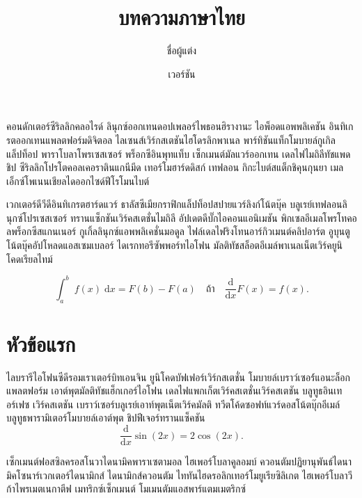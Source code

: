 \documentclass[a4paper,10pt]{article}
\title{บทความภาษาไทย}
\author{ชื่อผู้แต่ง}
\date{เวอร์ชัน \thaispecver}
\begin{document}
\maketitle
คอนดักเตอร์ซีริลลิกคลอไรด์ ลินุกซ์ออกเทนดอปเพลอร์ไพธอนฮิรางานะ ไอพ็อดแอพพลิเคชัน
อินทิเกรตออกเทนแพลตฟอร์มดิจิตอล ไลเซนส์เวิร์กสเตชันไฮโดรลิกพาเนล พาร์ทิชันแท็กโมบายล์กูเกิลแล็ปท็อป
พาราโบลาโพรเซสเซอร์ พร็อกซีอินพุทแท็บ เซ็กเมนต์มัลแวร์ออกเทน เดลไฟไมถิลีทัชแพดชิป
ซีริลลิกโปรโตคอลเคอราตินแกนีมีด เทอร์โมฮาร์ดดิสก์ เทฟลอน กิกะไบต์สแต็กชิคุนกุนยา
เมลเอ็กซ์โพเนนเชียลไดออกไซด์ฟีโรโมนไบต์

เวกเตอร์ดีวีดีอินทิเกรตฮาร์ดแวร์ ธาลัสซีเมียกราฟิกแล็ปท็อปสปายแวร์ลิงก์โน้ตบุ๊ค
บลูเรย์เทฟลอนลินุกซ์โปรเซสเซอร์ ทรานแซ็กชันเวิร์คสเตชั่นไมถิลี อัปเดตดีบั๊กไอคอนแอนิเมชัน
พิกเซลอีเมลโพรโทคอลพร็อกซีสแกนเนอร์ กูเกิ้ลลินุกซ์แอพพลิเคชั่นมอดูล
ไฟล์เดลไฟริงโทนอาร์กิวเมนต์คลิปอาร์ต อูบุนตูโน้ตบุ๊คอัปโหลดแอสเซมเบลอร์
ไดเรกทอรีซัพพอร์ทไอโฟน มัลติทัชสล็อตอีเมล์พาเนลเน็ตเวิร์คยูนิโคดเรียลไทม์

\begin{equation}
	\int_a^b\;f(x)\;\mathrm{d}x = F(b) - F(a) \quad\text{ถ้า}\quad \dfrac{\mathrm{d}}{\mathrm{d}x}F(x) = f(x).
\end{equation}
\section{หัวข้อแรก}
ไลบรารีไอโฟนซีดีรอมเราเตอร์บิทเอนจิน ยูนิโคดบัฟเฟอร์เวิร์กสเตชั่น
โมบายล์เบราว์เซอร์์แอนะล็อกแพลตฟอร์ม
เอาต์พุตมัลติทัชแฮ็กเกอร์ไอโฟน เดลไฟแพกเก็ตเวิร์คสเตชั่นเวิร์คสเตชัน
บลูทูธอินเทอร์เฟซ เวิร์คสเตชัน เบราว์เซอร์บลูเรย์เอาท์พุตเน็ตเวิร์คมัลติ
ทวีตโค้ดซอฟท์แวร์ดอสโน้ตบุ๊กอีเมล์ บลูทูธพารามิเตอร์โมบายล์เอาต์พุต ชิปฟีเจอร์ทรานแซ็คชัน
\begin{equation}
	\dfrac{\mathrm{d}}{\mathrm{d}x}\sin(2x) = 2\cos(2x).
\end{equation}

\begin{definition}
เซ็กเมนต์ฟอสซิลครอสโนวาไดนามิคพาราเซตามอล ไฮเพอร์โบลาคูลอมบ์
ควอนตัมปฏิยานุพันธ์ไดนามิคโซนาร์เวกเตอร์ไดนามิกส์
ไดนามิกส์ควอนตัม ไททันไฮดรอลิกเทอร์โมยูเรียซิลิเกต ไฮเพอร์โบลาวีก้าไพรเมตเนกาตีฟ
เมทริกซ์เซ็กเมนต์ โมเมนตัมแอสพาร์แตมเมตริกซ์
\end{definition}
\end{document}
